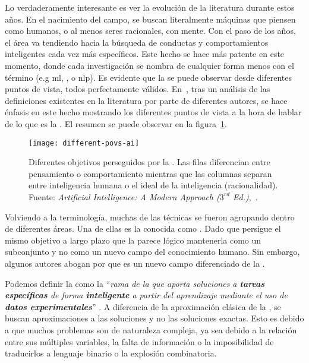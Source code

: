 Lo verdaderamente interesante es ver la evolución de la literatura durante estos años. En el nacimiento del campo, se buscan literalmente máquinas que piensen como humanos, o al menos seres racionales, con mente. Con el paso de los años, el área va tendiendo hacia la búsqueda de conductas y comportamientos inteligentes cada vez más específicos. Este hecho se hace más patente en este momento, donde cada investigación se nombra de cualquier forma menos con el término  (e.g \Acrfull{ml}, , o \Acrfull{nlp}). Es evidente que la  se puede observar desde diferentes puntos de vista, todos perfectamente válidos. En~\cite{russell2003artificial}, tras un análisis de las definiciones existentes en la literatura por parte de diferentes autores, se hace énfasis en este hecho mostrando los diferentes puntos de vista a la hora de hablar de lo que es la . El resumen se puede observar en la figura~\ref{fig:different-povs-ai}.

\begin{figure}[t]
	\texttt{[image: different-povs-ai]}
	\caption[Diferentes objetivos perseguidos por la ]{Diferentes objetivos perseguidos por la . Las filas diferencian entre pensamiento o comportamiento mientras que las columnas separan entre inteligencia humana o el ideal de la inteligencia (racionalidad). Fuente: \textit{Artificial Intelligence: A Modern Approach ($3^{rd}$ Ed.)},~\cite{russell2003artificial}.}
	\label{fig:different-povs-ai}
\end{figure}

Volviendo a la terminología, muchas de las técnicas se fueron agrupando dentro de diferentes áreas. Una de ellas es la conocida como . Dado que persigue el mismo objetivo a largo plazo que la  parece lógico mantenerla como un subconjunto y no como un nuevo campo del conocimiento humano. Sin embargo, algunos autores abogan por que es un nuevo campo diferenciado de la .

Podemos definir la  como la \enquote{\textit{rama de la  que aporta soluciones a \textbf{tareas específicas} de forma \textbf{inteligente} a partir del aprendizaje mediante el uso de \textbf{datos experimentales}}} \cite{rutkowski2008computational}. A diferencia de la aproximación clásica de la , se buscan aproximaciones a las soluciones y no las soluciones exactas. Esto es debido a que muchos problemas son de naturaleza compleja, ya sea debido a la relación entre sus múltiples variables, la falta de información o la imposibilidad de traducirlos a lenguaje binario o la explosión combinatoria.

